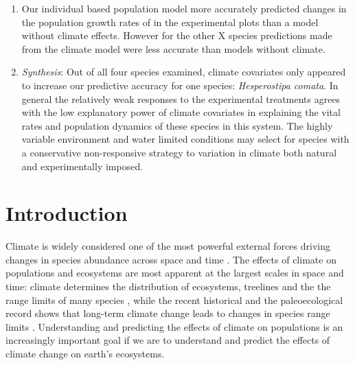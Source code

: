 \documentclass[11pt]{article}
\begin{document}
\begin{doublespacing}
\begin{enumerate}
\item Our individual based population model more accurately predicted changes in the population growth rates of \textit{} in the experimental plots than a model without climate effects.  However for the other X species predictions made from the climate model were less accurate than models without climate.   
\item \emph{Synthesis}: Out of all four species examined, climate covariates only appeared to increase our predictive accuracy for one species: \textit{Hesperostipa comata}. In general the relatively weak responses to the experimental treatments agrees with the low explanatory power of climate covariates in explaining the vital rates and population dynamics of these species in this system. The highly variable environment and water limited conditions may select for species with a conservative non-responsive strategy to variation in climate both natural and experimentally imposed.  

\end{enumerate}


\section*{Introduction}

Climate is widely considered one of the most powerful external forces driving changes in species abundance across space and time \citep{teller_linking_2016}.  The effects of climate on populations and ecosystems are most apparent at the largest scales in space and time: climate determines the distribution of ecosystems, treelines and the the range limits of many species \citep{}, while the recent historical and the paleoecological record shows that long-term climate change leads to changes in species range limits \citep{parmesan, davis}. Understanding and predicting the effects of climate on populations is an increasingly important goal if we are to understand and predict the effects of climate change on earth's ecosystems. 


\end{doublespacing}
\end{document}
